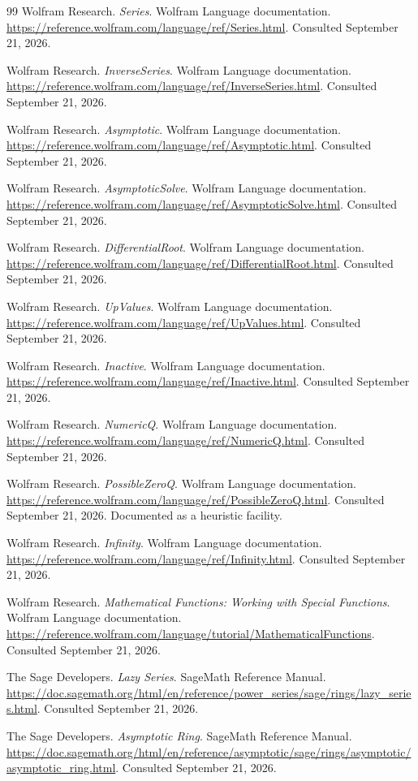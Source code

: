 \documentclass[11pt,letterpaper]{article}
\numberwithin{equation}{section}
\theoremstyle{definition}
\theoremstyle{remark}
\begin{document}
\begin{thebibliography}{99}
Wolfram Research. \emph{Series}. Wolfram Language documentation.
\url{https://reference.wolfram.com/language/ref/Series.html}. Consulted
September 21, 2026.

Wolfram Research. \emph{InverseSeries}. Wolfram Language documentation.
\url{https://reference.wolfram.com/language/ref/InverseSeries.html}. Consulted
September 21, 2026.

Wolfram Research. \emph{Asymptotic}. Wolfram Language documentation.
\url{https://reference.wolfram.com/language/ref/Asymptotic.html}. Consulted
September 21, 2026.

Wolfram Research. \emph{AsymptoticSolve}. Wolfram Language documentation.
\url{https://reference.wolfram.com/language/ref/AsymptoticSolve.html}.
Consulted September 21, 2026.

Wolfram Research. \emph{DifferentialRoot}. Wolfram Language documentation.
\url{https://reference.wolfram.com/language/ref/DifferentialRoot.html}.
Consulted September 21, 2026.

Wolfram Research. \emph{UpValues}. Wolfram Language documentation.
\url{https://reference.wolfram.com/language/ref/UpValues.html}. Consulted
September 21, 2026.

Wolfram Research. \emph{Inactive}. Wolfram Language documentation.
\url{https://reference.wolfram.com/language/ref/Inactive.html}. Consulted
September 21, 2026.

Wolfram Research. \emph{NumericQ}. Wolfram Language documentation.
\url{https://reference.wolfram.com/language/ref/NumericQ.html}. Consulted
September 21, 2026.

Wolfram Research. \emph{PossibleZeroQ}. Wolfram Language documentation.
\url{https://reference.wolfram.com/language/ref/PossibleZeroQ.html}. Consulted
September 21, 2026. Documented as a heuristic facility.

Wolfram Research. \emph{Infinity}. Wolfram Language documentation.
\url{https://reference.wolfram.com/language/ref/Infinity.html}. Consulted
September 21, 2026.

Wolfram Research. \emph{Mathematical Functions: Working with Special
Functions}. Wolfram Language documentation.
\url{https://reference.wolfram.com/language/tutorial/MathematicalFunctions}.
Consulted September 21, 2026.

The Sage Developers. \emph{Lazy Series}. SageMath Reference Manual.
\url{https://doc.sagemath.org/html/en/reference/power_series/sage/rings/lazy_series.html}.
Consulted September 21, 2026.

The Sage Developers. \emph{Asymptotic Ring}. SageMath Reference Manual.
\url{https://doc.sagemath.org/html/en/reference/asymptotic/sage/rings/asymptotic/asymptotic_ring.html}.
Consulted September 21, 2026.

\end{thebibliography}
\end{document}
